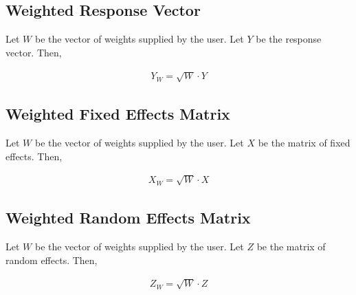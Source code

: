 \documentclass{article}
\begin{document}
\subsection{Weighted Response Vector}
Let $W$ be the vector of weights supplied by the user.  Let $Y$ be the response vector. Then, 

\begin{align}
Y_W = \sqrt{W} \cdot Y
\end{align}

\subsection{Weighted Fixed Effects Matrix}
Let $W$ be the vector of weights supplied by the user. Let $X$ be the matrix of fixed effects. Then, 

\begin{align}
X_W = \sqrt{W} \cdot X
\end{align}

\subsection{Weighted Random Effects Matrix}
Let $W$ be the vector of weights supplied by the user. Let $Z$ be the matrix of random effects. Then,

\begin{align}
Z_W = \sqrt{W} \cdot Z
\end{align}
\end{document}
